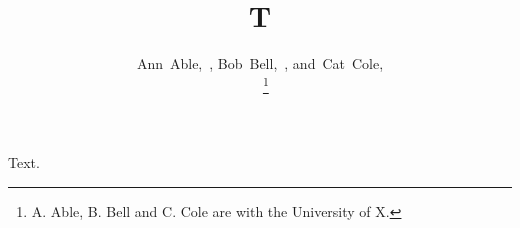 \documentclass[journal]{IEEEtran}
\begin{document}
\title{T}
\author{Ann~Able,~, Bob~Bell,~,
        and~Cat~Cole,\\~%
\thanks{A. Able, B. Bell and C. Cole are with the University of X.}}
\maketitle
Text.
\end{document}
